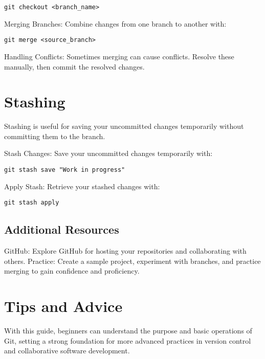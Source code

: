 \documentclass[10pt,twocolumn]{article}
\begin{document}
\begin{verbatim}
git checkout <branch_name>
\end{verbatim}

Merging Branches: Combine changes from one branch to another with:

\begin{verbatim}
git merge <source_branch>
\end{verbatim}

Handling Conflicts: Sometimes merging can cause conflicts. Resolve these manually, then commit the resolved changes.

\section{Stashing}

Stashing is useful for saving your uncommitted changes temporarily without committing them to the branch.

Stash Changes: Save your uncommitted changes temporarily with:

\begin{verbatim}
git stash save "Work in progress"
\end{verbatim}

Apply Stash: Retrieve your stashed changes with:

\begin{verbatim}
git stash apply
\end{verbatim}

\subsection{Additional Resources}

GitHub: Explore GitHub for hosting your repositories and collaborating with others. Practice: Create a sample project, experiment with branches, and practice merging to gain confidence and proficiency.

\section{Tips and Advice}

With this guide, beginners can understand the purpose and basic operations of Git, setting a strong foundation for more advanced practices in version control and collaborative software development.

\printbibliography
\end{document}
